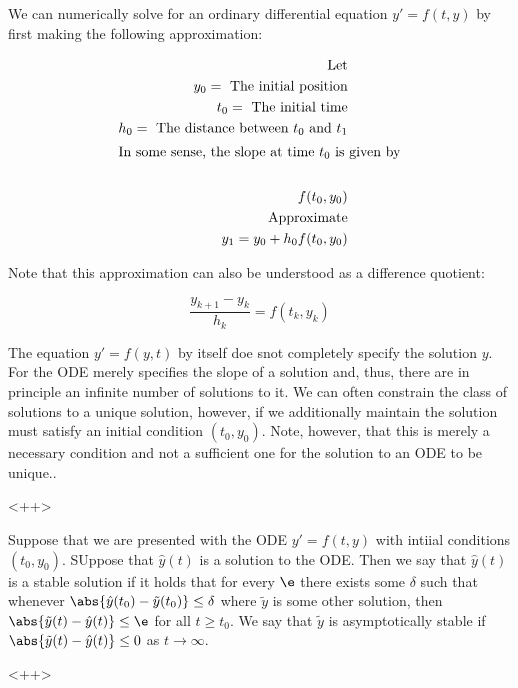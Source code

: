 \documentclass[../main.tex]{subfiles}
\begin{document}
\begin{remark}
    We can numerically solve for an ordinary differential equation $y' = f(t,y)$ by first making the following approximation:

    \begin{align*}
        \text{Let} \\
        y_0 = \text{ The initial position} \\
        t_0 = \text{ The initial time} \\
        h_0 = \text{ The distance between $t_0$ and $t_1$} \\
        \intertext{In some sense, the slope at time $t_0$ is given by} \\
        f(t_0, y_0) \\
        \text{Approximate} \\
        y_1 = y_0 + h_0f(t_0, y_0) \\
    \end{align*}


    Note that this approximation can also be understood as a difference quotient:

    \[
        \frac{y_{k+1} - y_{k}}{h_k} = f(t_k, y_k)
    \]
\end{remark}

\begin{remark}
    The equation $y' = f(y,t)$ by itself doe snot completely specify the solution $y$. For the ODE merely specifies the slope of a solution and, thus, there are in principle an infinite number of solutions to it. We can often constrain the class of solutions to a unique solution, however, if we additionally maintain the solution must satisfy an initial condition $(t_0, y_0)$. Note, however, that this is merely a necessary condition and not a sufficient one for the solution to an ODE to be unique..
\end{remark}<++>
\begin{definition}
    Suppose that we are presented with the ODE $y' = f(t,y)$ with intiial conditions $(t_0, y_0)$. SUppose that $\hat{y}(t)$ is a solution to the ODE. Then we say that $\hat{y}(t)$ is a stable solution if it holds that for every $\e$ there exists some $\delta$ such that whenever $\abs{\hat{y}(t_0) - \tilde{y}(t_0)} \leq \delta$ where $\tilde{y}$ is some other solution, then $\abs{\tilde{y}(t) - \hat{y}(t)} \leq \e$ for all $t \geq t_0$. We say that $\tilde{y}$ is asymptotically stable if $\abs{\tilde{y}(t) - \hat{y}(t)} \leq 0$ as $t \to \infty$.
\end{definition}<++>
\end{document}
